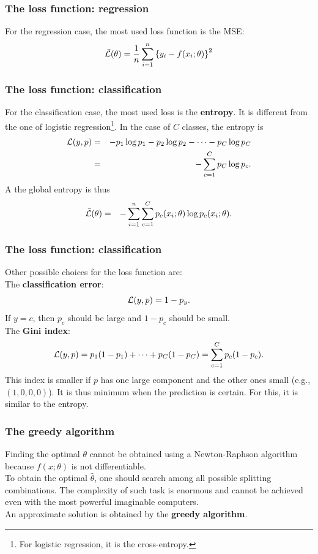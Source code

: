 \begin{frame}
\frametitle{The loss function: regression}
For the regression case, the most used loss function is the MSE:
$$
\bar{\cal L}(\theta) = \frac{1}{n} \sum_{i=1}^n \left\{y_i - f(x_i;\theta)\right\}^2
$$
\end{frame}
\begin{frame}
\frametitle{The loss function: classification}
For the classification case, the most used loss is the {\bf entropy}. It is different from the one of logistic regression\footnote{For logistic regression, it is the cross-entropy.}. In the case of $C$ classes, the entropy is
\begin{eqnarray*}
{\cal L}(y, p) &=& - p_1 \log p_1 - p_2 \log p_2 - \cdots - p_C \log p_C\\
&=& - \sum_{c=1}^C p_C \log p_c.
\end{eqnarray*}
A the global entropy is thus
\begin{eqnarray*}
\bar{\cal L}(\theta) &=& - \sum_{i=1}^n\sum_{c=1}^C p_c(x_i;\theta) \log p_c(x_i;\theta).
\end{eqnarray*}
\end{frame}
\begin{frame}
\frametitle{The loss function: classification}
Other possible choices for the loss function are: \\
\vspace{0.3cm}
The {\bf classification error}: 
$$
{\cal L}(y,p) = 1 - p_y.
$$
If $y=c$, then $p_c$ should be large and $1-p_c$ should be small.\\
\vspace{0.3cm}
The {\bf Gini index}:
$$
{\cal L}(y,p) = p_1(1-p_1) + \cdots + p_C(1-p_C) = \sum_{c=1}^C p_c(1-p_c).
$$
This index is smaller if $p$ has one large component and the other ones small (e.g., $(1,0,0,0)$). It is thus minimum when the prediction is certain. For this, it is similar to the entropy.
\end{frame}
\begin{frame}
\frametitle{The greedy algorithm}
Finding the optimal $\theta$ cannot be obtained using a Newton-Raphson algorithm because $f(x;\theta)$ is not differentiable.\\ 
\vspace{0.3cm}
To obtain the optimal $\hat{\theta}$, one should search among all possible splitting combinations. The complexity of such task is enormous and cannot be achieved even with the most powerful imaginable computers. \\
\vspace{0.3cm}
An approximate solution is obtained by the {\bf greedy algorithm}.
\end{frame}
